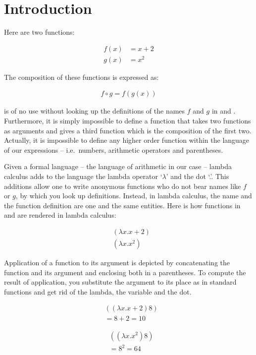 \documentclass[11pt]{article}
\begin{document}
\section{Introduction} Here are two functions:

\begin{align}
\label{f} f(x) & = x + 2\\ 
\label{g}g(x) & = x^2
\end{align}

The composition of these functions is expressed as:

\begin{align}
f\circ g = f(g(x))\label{fog}
\end{align}


 is of no use without looking up the definitions of the names $f$ and $g$ in  and . Furthermore, it is simply impossible to define a function that takes two functions as arguments and gives a third function which is the composition of the first two. Actually, it is impossible to define any higher order function within the language of our expressions -- i.e.\ numbers, arithmetic operators and parentheses.

Given a formal language -- the language of arithmetic in our case -- lambda calculus adds to the language the lambda operator `$\lambda$' and the dot `.'. This additions allow one to write anonymous functions who do not bear names like $f$ or $g$, by which you look up definitions. Instead, in lambda calculus, the name and the function definition are one and the same entities. Here is how functions in  and  are rendered in lambda calculus:

\begin{align}
\label{lf} & (\lambda x.x + 2)\\ 
\label{lg} & (\lambda x.x^2)
\end{align}

Application of a function to its argument is depicted by concatenating the function and its argument and enclosing both in a parentheses. To compute the result of application, you substitute the argument to its place as in standard functions and get rid of the lambda, the variable and the dot.

\begin{align}
\label{af} & ((\lambda x.x + 2) 8)\\ 
 & = 8 +2  = 10\nonumber
\end{align}

\begin{align}
\label{ag} & ((\lambda x.x^2) 8)\\
& = 8^2 = 64\nonumber
\end{align}
\end{document}
